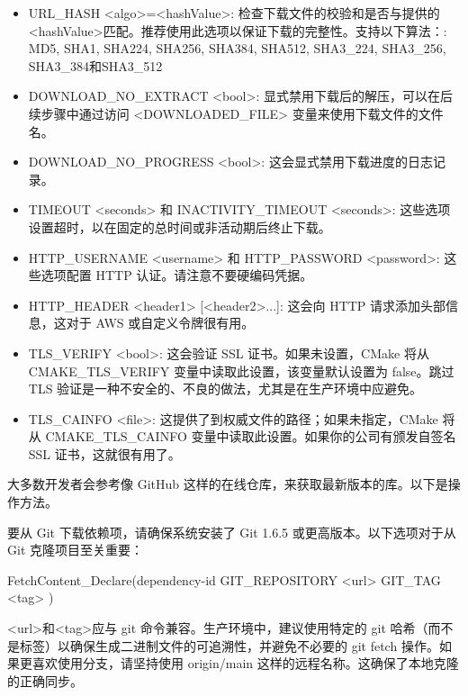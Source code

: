 \begin{itemize}
\item
URL\_HASH <algo>=<hashValue>: 检查下载文件的校验和是否与提供的<hashValue>匹配。推荐使用此选项以保证下载的完整性。支持以下算法：: MD5, SHA1, SHA224, SHA256, SHA384, SHA512, SHA3\_224, SHA3\_256, SHA3\_384和SHA3\_512

\item
DOWNLOAD\_NO\_EXTRACT <bool>: 显式禁用下载后的解压，可以在后续步骤中通过访问 <DOWNLOADED\_FILE> 变量来使用下载文件的文件名。

\item
DOWNLOAD\_NO\_PROGRESS <bool>: 这会显式禁用下载进度的日志记录。

\item
TIMEOUT <seconds> 和 INACTIVITY\_TIMEOUT <seconds>: 这些选项设置超时，以在固定的总时间或非活动期后终止下载。

\item
HTTP\_USERNAME <username> 和 HTTP\_PASSWORD <password>: 这些选项配置 HTTP 认证。请注意不要硬编码凭据。

\item
HTTP\_HEADER <header1> [<header2>...]: 这会向 HTTP 请求添加头部信息，这对于 AWS 或自定义令牌很有用。

\item
TLS\_VERIFY <bool>: 这会验证 SSL 证书。如果未设置，CMake 将从 CMAKE\_TLS\_VERIFY 变量中读取此设置，该变量默认设置为 false。跳过 TLS 验证是一种不安全的、不良的做法，尤其是在生产环境中应避免。

\item
TLS\_CAINFO <file>: 这提供了到权威文件的路径；如果未指定，CMake 将从 CMAKE\_TLS\_CAINFO 变量中读取此设置。如果你的公司有颁发自签名 SSL 证书，这就很有用了。
\end{itemize}

大多数开发者会参考像 GitHub 这样的在线仓库，来获取最新版本的库。以下是操作方法。


要从 Git 下载依赖项，请确保系统安装了 Git 1.6.5 或更高版本。以下选项对于从 Git 克隆项目至关重要：

\begin{shell}
FetchContent_Declare(dependency-id
                     GIT_REPOSITORY <url>
                     GIT_TAG <tag>
)
\end{shell}

<url>和<tag>应与 git 命令兼容。生产环境中，建议使用特定的 git 哈希（而不是标签）以确保生成二进制文件的可追溯性，并避免不必要的 git fetch 操作。如果更喜欢使用分支，请坚持使用 origin/main 这样的远程名称。这确保了本地克隆的正确同步。

